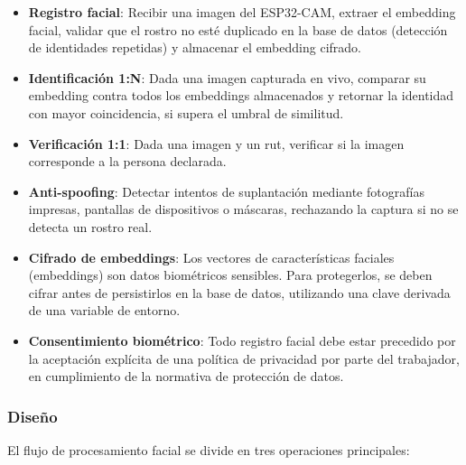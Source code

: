 \begin{itemize}
    \item \textbf{Registro facial}: Recibir una imagen del ESP32-CAM, extraer el embedding facial, validar que el rostro no esté duplicado en la base de datos (detección de identidades repetidas) y almacenar el embedding cifrado.
    \item \textbf{Identificación 1:N}: Dada una imagen capturada en vivo, comparar su embedding contra todos los embeddings almacenados y retornar la identidad con mayor coincidencia, si supera el umbral de similitud.
    \item \textbf{Verificación 1:1}: Dada una imagen y un rut, verificar si la imagen corresponde a la persona declarada.
    \item \textbf{Anti-spoofing}: Detectar intentos de suplantación mediante fotografías impresas, pantallas de dispositivos o máscaras, rechazando la captura si no se detecta un rostro real.
    \item \textbf{Cifrado de embeddings}: Los vectores de características faciales (embeddings) son datos biométricos sensibles. Para protegerlos, se deben cifrar antes de persistirlos en la base de datos, utilizando una clave derivada de una variable de entorno.
    \item \textbf{Consentimiento biométrico}: Todo registro facial debe estar precedido por la aceptación explícita de una política de privacidad por parte del trabajador, en cumplimiento de la normativa de protección de datos.
\end{itemize}

\subsubsection{Diseño}

El flujo de procesamiento facial se divide en tres operaciones principales:

